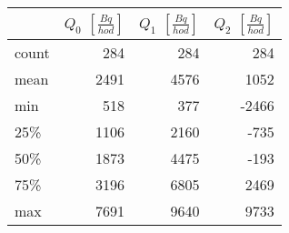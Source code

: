 \begin{tabular}{lrrr}
\toprule
{} &  $Q_0$ $\left[\si{\frac{Bq}{hod}}\right]$ &  $Q_1$ $\left[\si{\frac{Bq}{hod}}\right]$ &  $Q_2$ $\left[\si{\frac{Bq}{hod}}\right]$ \\
\midrule
count &                                       284 &                                       284 &                                       284 \\
mean  &                                      2491 &                                      4576 &                                      1052 \\
min   &                                       518 &                                       377 &                                     -2466 \\
25\%   &                                      1106 &                                      2160 &                                      -735 \\
50\%   &                                      1873 &                                      4475 &                                      -193 \\
75\%   &                                      3196 &                                      6805 &                                      2469 \\
max   &                                      7691 &                                      9640 &                                      9733 \\
\bottomrule
\end{tabular}
